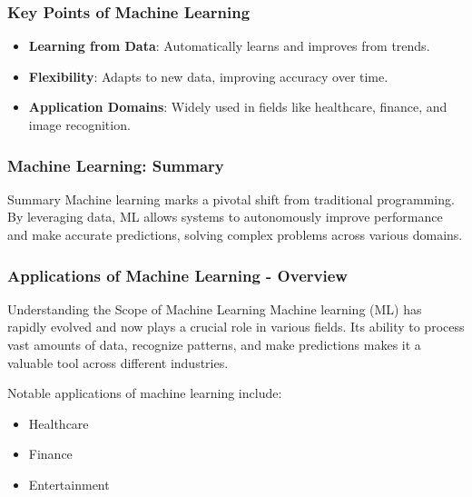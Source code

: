 \documentclass[aspectratio=169]{beamer}
\begin{document}
\begin{frame}[fragile]
    \frametitle{Key Points of Machine Learning}
    \begin{itemize}
        \item \textbf{Learning from Data}: Automatically learns and improves from trends.
        \item \textbf{Flexibility}: Adapts to new data, improving accuracy over time.
        \item \textbf{Application Domains}: Widely used in fields like healthcare, finance, and image recognition.
    \end{itemize}
\end{frame}

\begin{frame}[fragile]
    \frametitle{Machine Learning: Summary}
    \begin{block}{Summary}
        Machine learning marks a pivotal shift from traditional programming. By leveraging data, ML allows systems to autonomously improve performance and make accurate predictions, solving complex problems across various domains.
    \end{block}
\end{frame}

\begin{frame}[fragile]
  \frametitle{Applications of Machine Learning - Overview}
  \begin{block}{Understanding the Scope of Machine Learning}
    Machine learning (ML) has rapidly evolved and now plays a crucial role in various fields. Its ability to process vast amounts of data, recognize patterns, and make predictions makes it a valuable tool across different industries.
  \end{block}
    
  Notable applications of machine learning include:
  \begin{itemize}
    \item Healthcare
    \item Finance
    \item Entertainment
  \end{itemize}
\end{frame}
\end{document}
